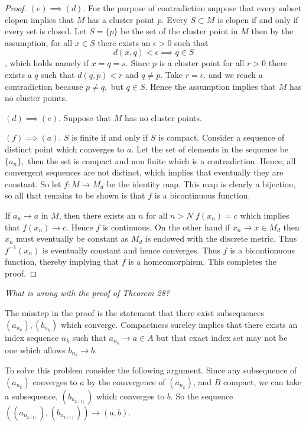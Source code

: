 \documentclass[letter]{article}
\newenvironment{menumerate}{%
  \edef\backupindent{\the\parindent}%
  \enumerate%
  \setlength{\parindent}{\backupindent}%
}{\endenumerate}
\begin{document}
\begin{menumerate}
\begin{proof}
				$(e) \implies (d).$ For the purpose of contradiction suppose that every subset clopen implies that $M$ has a cluster point $p$. Every $S \subset M$ is clopen if and only if every set is closed. Let $S = \{p\}$ be the set of the cluster point in $M$ then by the assumption, for all $x \in S$ there exists an $\epsilon > 0$ such that $$d(x,q) < \epsilon \implies q \in S$$, which holds namely if $x = q= s.$ Since $p$ is a cluster point for all $r > 0$ there exists a $q$ such that $d(q,p) < r$ and $q \neq p.$ Take $r = \epsilon.$ and we reach a contradiction because $p \neq q,$ but $q \in S.$ Hence the assumption implies that $M$ has no cluster points.

				$(d) \implies (e).$ Suppose that $M$ has no cluster points. 



				$(f) \implies (a).$
					$S$ is finite if and only if $S$ is compact. Consider a sequence of distinct point which converges to $a.$ Let the set of elements in the sequence be $\{a_n\},$ then the set is compact and non finite which is a contradiction. Hence, all convergent sequences are not distinct, which implies that eventually they are constant. So let $f:M \to M_d$ be the identity map. This map is clearly a bijection, so all that remains to be shown is that $f$ is a bicontinuous function.

					If $a_n \to a$ in $M$, then there exists an $n$ for all $n > N$ $f(x_n) = c$ which implies that $f(x_n) \to c.$ Hence $f$ is continuous. On the other hand if $x_n \to x \in M_d$ then $x_n$ must eventually be constant as $M_d$ is endowed with the discrete metric. Thus $f^{-1}(x_n)$ is eventually constant and hence converges. Thus $f$ is a bicontionuous function, thereby implying that $f$ is a homeomorphism. This completes the proof.
			\end{proof}
			


		\setcounter{enumi}{41}
		\item \emph{What is wrong with the proof of Theorem 28?}

		 The misstep in the proof is the statement that there exist subsequences $(a_{n_k}), (b_{n_k}) $ which converge. Compactness sureley implies that there exists an index sequence $n_k$ such that $a_{n_k} \to a \in A$ but that exact index set may not be one which allows $b_{n_k} \to b$. 

		To solve this problem consider the following argument. Since any subsequence of $(a_{n_k})$ converges to $a$ by the convergence of $(a_{n_k})$, and $B$ compact, we can take a subsequence, $(b_{n_{k(l)}})$ which converges to $b$. So the sequence $((a_{n_{k(l)}}),(b_{n_{k(l)}})) \to (a,b).$



\end{menumerate}
\end{document}
